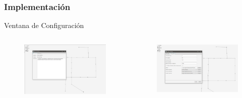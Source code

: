 \documentclass[9pt]{beamer}
\begin{document}
    \begin{frame}
        \frametitle{Implementación}
        Ventana de Configuración                
        
        \begin{columns}
            \begin{figure}
                \includegraphics[width=\textwidth]{assets/Interfaces/ConfiguracionProblema1.png}
            \end{figure}
            \begin{figure}
                \includegraphics[width=\textwidth]{assets/Interfaces/ConfiguracionProblema2.png}
            \end{figure}
        \end{columns}
    \end{frame}
    
\end{document}
